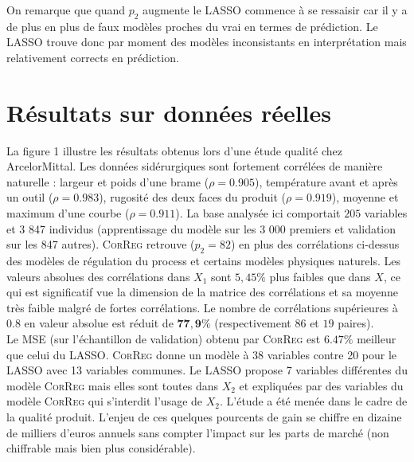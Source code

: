 \documentclass[12pt]{article}
\begin{document}
On remarque que quand $p_2$ augmente le LASSO commence à se ressaisir car il y a de plus en plus de faux modèles proches du vrai en termes de prédiction. Le LASSO trouve donc par moment des modèles inconsistants en interprétation mais relativement corrects en prédiction. %
\section{Résultats sur données réelles}\label{secresrel}
La figure 1 illustre les résultats obtenus lors d'une étude qualité chez ArcelorMittal.  Les données sidérurgiques sont fortement corrélées de manière naturelle : largeur et poids d'une brame ($\rho=0.905$), température avant et après un outil ($\rho=0.983$), rugosité des deux faces du produit ($\rho=0.919$), moyenne et maximum d'une courbe ($\rho=0.911$). La base analysée ici comportait $205$ variables et 3 847 individus (apprentissage du modèle sur les 3 000 premiers et validation sur les 847 autres).
%
\textsc{CorReg} retrouve ($p_2=82$) en plus des corrélations ci-dessus des modèles de régulation du process et certains modèles physiques naturels. Les valeurs absolues des corrélations dans $X_1$ sont $5,45\%$ plus faibles que dans $X$, ce qui est significatif vue la dimension de la matrice des corrélations et sa moyenne très faible malgré de fortes corrélations. Le nombre de corrélations supérieures à $0.8$ en valeur absolue est réduit de $\mathbf{77,9\%}$ (respectivement $86$ et $19$ paires).
\\
		Le MSE (sur l'échantillon de validation) obtenu par \textsc{CorReg} est $\mathbf{6.47\%}$ meilleur que celui du LASSO.  \textsc{CorReg} donne un modèle à 38 variables contre 20 pour le LASSO avec 13 variables communes. Le LASSO propose 7 variables différentes du modèle  \textsc{CorReg} mais elles sont toutes dans $X_2$ et expliquées par des variables du modèle  \textsc{CorReg} qui s'interdit l'usage de $X_2$.
		 L'étude a été menée dans le cadre de la qualité produit. L'enjeu de ces quelques pourcents de gain se chiffre en dizaine de milliers d'euros annuels sans compter l'impact sur les parts de marché (non chiffrable mais bien plus considérable).
	
\end{document}
